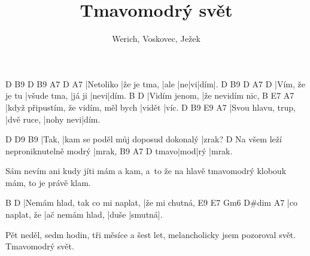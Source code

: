 \documentclass{song}
\title{Tmavomodrý svět}
\author{Werich, Voskovec, Ježek}
\begin{document}
\strophe
D         B9          D    B9 A7 D  A7
|Netoliko |že je tma, |ale |ne|vi|dím|.
D              B9          D      A7  D
|Vím, že je tu |všude tma, |já ji |nevi|dím.
B             D
|Vidím jenom, |že nevidím nic,
B                                   E7     A7
|když připustím, že vidím, měl bych |vidět |víc.
D                  B9         E9        A7
|Svou hlavu, trup, |dvě ruce, |nohy nevi|dím.
\endstrophe

D     D9                                 B9
|Tak, |kam se poděl můj doposud dokonalý |zrak?
                                   D
Na všem leží neproniknutelně modrý |mrak,
     B9  A7  D
tmavo|mod|rý |mrak.
\endstrophe

Sám nevím ani kudy jíti mám a kam,
a~to že na hlavě tmavomodrý klobouk mám,
to je právě klam.
\endstrophe

\strophe
B                              D
|Nemám hlad, tak co mi naplat, |že mi chutná,
E9             E7              Gm6   D\#dim A7
|co naplat, že |ač nemám hlad, |duše |smutná|.
\endstrophe

Pět neděl, sedm hodin, tři měsíce a šest let,
melancholicky jsem pozoroval svět.
Tmavomodrý svět.
\endstrophe

\end{document}
